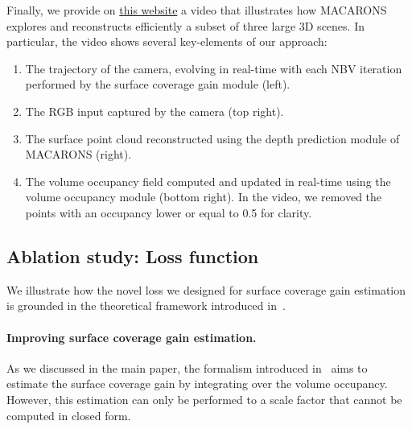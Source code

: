 Finally, we provide on \href{https://imagine.enpc.fr/~guedona/MACARONS/}{this website} a video that illustrates how MACARONS explores and reconstructs efficiently a subset of three large 3D scenes. In particular, the video shows several key-elements of our approach:
\begin{enumerate}
    \item The trajectory of the camera, evolving in real-time with each NBV iteration performed by the surface coverage gain module (left).
    \item The RGB input captured by the camera (top right).
    \item The surface point cloud reconstructed using the depth prediction module of MACARONS (right).
    \item The volume occupancy field computed and updated in real-time using the volume occupancy module (bottom right). In the video, we removed the points with an occupancy lower or equal to 0.5 for clarity.
\end{enumerate}

\subsection{Ablation study: Loss function}
%

We illustrate how the novel loss we designed for surface coverage gain estimation is grounded in the theoretical framework introduced in~\cite{guedon-nips22-scone-surface-coverage}. 

\paragraph{Improving surface coverage gain estimation.} As we discussed in the main paper, the formalism introduced in~\cite{guedon-nips22-scone-surface-coverage} aims to estimate the surface coverage gain by integrating over the volume occupancy. However, this estimation can only be performed to a scale factor that cannot be computed in closed form. 




% 
% 

